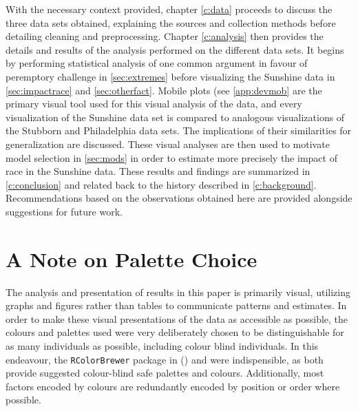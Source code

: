 With the necessary context provided, chapter \ref{c:data} proceeds to discuss the three data sets obtained, explaining the sources
and collection methods before detailing cleaning and preprocessing. Chapter \ref{c:analysis} then provides the details and results
of the analysis performed on the different data sets. It begins by performing statistical analysis of one common argument in
favour of peremptory challenge in \ref{sec:extremes} before visualizing the Sunshine data in \ref{sec:impactrace} and
\ref{sec:otherfact}. Mobile plots (see \ref{app:devmob} are the primary visual tool used for this visual analysis of the data, and
every visualization of the Sunshine data set is compared to analogous visualizations of the Stubborn and Philadelphia data
sets. The implications of their similarities for generalization are discussed. These visual analyses are then used to motivate
model selection in \ref{sec:mods} in order to estimate more precisely the impact of race in the Sunshine data. These results and
findings are summarized in \ref{c:conclusion} and related back to the history described in \ref{c:background}. Recommendations
based on the observations obtained here are provided alongside suggestions for future work.

\section{A Note on Palette Choice}

The analysis and presentation of results in this paper is primarily visual, utilizing graphs and figures rather than tables to
communicate patterns and estimates. In order to make these visual presentations of the data as accessible as possible, the colours
and palettes used were very deliberately chosen to be distinguishable for as many individuals as possible, including colour blind
individuals. In this endeavour, the \texttt{RColorBrewer} package in \Rp (\cite{rcolorbrewer}) and \cite{wong2011} were
indispensible, as both provide suggested colour-blind safe palettes and colours. Additionally, most factors encoded by colours
are redundantly encoded by position or order where possible.

